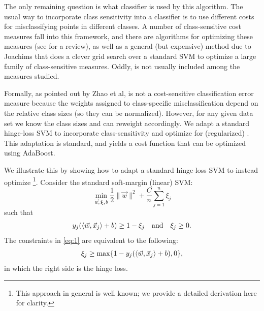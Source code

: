 The only remaining question is what classifier is used by this algorithm.  The usual way to incorporate class sensitivity into a classifier is to use different costs for misclassifying points in different classes. A number of class-sensitive cost measures fall into this framework, and there are algorithms for optimizing these measures (see \cite{menon2013statistical} for a review), as well as a general (but expensive) method due to Joachims that does a clever grid search over a standard SVM to optimize a large family of class-sensitive measures\cite{joachims2005support}. Oddly, \ber is not usually included among the measures studied. 

Formally, as pointed out by Zhao et al\cite{zhao2013beyond}, \ber is not a
cost-sensitive classification error measure because the weights assigned to
class-specific misclassification depend on the relative class sizes (so they can
be normalized). However, for any given data set we know the class sizes and can
reweight accordingly. We adapt a standard hinge-loss SVM to incorporate
class-sensitivity and optimize for (regularized) \ber. This adaptation is
standard, and yields a cost function that can be optimized using AdaBoost. %

  We illustrate this by showing how to adapt a standard hinge-loss SVM to instead optimize \ber\footnote{This approach in general is well known; we provide a detailed derivation here for clarity.}. Consider the standard soft-margin (linear) SVM:
 \begin{equation}
 \min_{\vec{w},\boldsymbol{\xi},b}\frac{1}{2}\|\vec{w}\|^2 + \frac{C}{n}\sum_{j=1}^n\xi_j
 \end{equation}
such that
 \begin{equation} 
 y_j(\left\langle \vec{w}, \vec{x}_j \right\rangle + b)\geq 1-\xi_j\quad\text{and}\quad \xi_j\geq 0\label{eq:1}.
 \end{equation}
 The constraints in \eqref{eq:1} are equivalent to the following:
 \begin{equation}
 \xi_j \geq \max\{1 - y_j(\left\langle \vec{w}, \vec{x}_j \right\rangle + b), 0\},
 \end{equation}
 in which the right side is the hinge loss.

